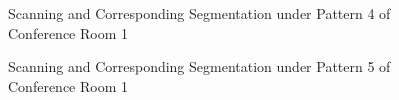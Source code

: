 \documentclass[11pt, a4paper,oneside,chapterprefix=false]{scrbook}
\begin{document}
\vspace{80pt}

\begin{figure}[H]
    \centering
      \label{fig:conf1 4 occluded} \hfill
     \label{fig:conf1 4 seg}
    \caption{Scanning and Corresponding Segmentation under Pattern 4 of Conference Room 1}
    \label{fig:conf1 4 occ and seg}
\end{figure}

\begin{figure}[H]
    \centering
      \label{fig:conf1 5 occluded} \hfill
     \label{fig:conf1 5 seg}
    \caption{Scanning and Corresponding Segmentation under Pattern 5 of Conference Room 1}
    \label{fig:conf1 5 occ and seg}
\end{figure}
\end{document}
